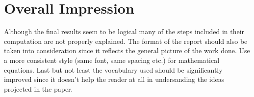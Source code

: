 \section{Overall Impression}%

Although the final results seem to be logical many of the steps included in their computation are not properly explained.
The format of the report should also be taken into consideration since it reflects the general picture of the work done. Use a more consistent style (same font, same spacing etc.) for mathematical equations. Last but not least the vocabulary used should be significantly improved since it doesn't help the reader at all in undersanding the ideas projected in the paper.

